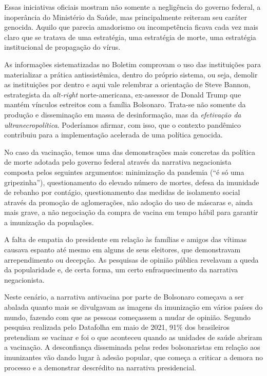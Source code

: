 Essas iniciativas oficiais mostram não somente a negligência do governo
federal, a inoperância do Ministério da Saúde, mas principalmente
reiteram seu caráter genocida. Aquilo que parecia amadorismo ou
incompetência ficava cada vez mais claro que se tratava de uma
estratégia, uma estratégia de morte, uma estratégia institucional de
propagação do vírus.

As informações sistematizadas no Boletim comprovam o uso das
instituições para materializar a prática antissistêmica, dentro do
próprio sistema, ou seja, demolir as instituições por dentro e aqui vale
relembrar a orientação de Steve Bannon, estrategista da \textit{alt-right}
norte-americana, ex-assessor de Donald Trump que mantém vínculos estreitos com
a família Bolsonaro. Trata-se não somente da produção e disseminação em
massa de desinformação, mas da \textit{efetivação da ultranecropolítica}. Poderíamos
afirmar, com isso, que o contexto pandêmico contribuiu para a implementação
acelerada de uma política genocida.

No caso da vacinação, temos uma das demonstrações mais concretas da
política de morte adotada pelo governo federal através da narrativa
negacionista composta pelos seguintes argumentos: minimização da
pandemia (``é só uma gripezinha''), questionamento do elevado número de
mortes, defesa da imunidade de rebanho por contágio, questionamento das
medidas de isolamento social através da promoção de aglomerações, não
adoção do uso de máscaras e, ainda mais grave, a não negociação da compra de
vacina em tempo hábil para garantir a imunização da populações.

A falta de empatia do presidente em relação às famílias e amigos das
vítimas causava espanto até mesmo em alguns de seus eleitores, que demonstravam
arrependimento ou decepção. As pesquisas de
opinião pública revelavam a queda da popularidade e, de certa forma, um
certo enfraquecimento da narrativa negacionista.

Neste cenário, a narrativa antivacina por parte de Bolsonaro começava a
ser abalada quanto mais se divulgavam as imagens da imunização em vários
países do mundo, fazendo com que as pessoas começassem a mudar de
opinião. Segundo pesquisa realizada pelo Datafolha em maio de 2021, 91\%
dos brasileiros pretendiam se vacinar e foi o que aconteceu quando as
unidades de saúde abriram a vacinação. A desconfiança disseminada pelas
redes bolsonaristas em relação aos imunizantes vão dando lugar à adesão
popular, que começa a criticar a demora no processo e a
demonstrar descrédito na narrativa presidencial.

